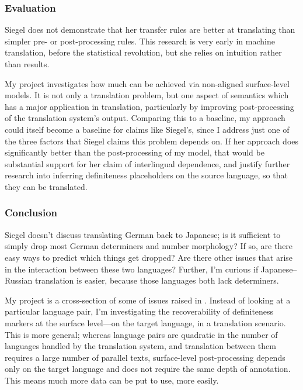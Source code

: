 \documentclass[11pt]{article}
\begin{document}
\subsubsection*{Evaluation}

Siegel does not demonstrate that her transfer rules are better at translating than simpler pre- or post-processing rules. This research is very early in machine translation, before the statistical revolution, but she relies on intuition rather than results.

My project investigates how much can be achieved via non-aligned surface-level models. It is not only a translation problem, but one aspect of semantics which has a major application in translation, particularly by improving post-processing of the translation system's output. Comparing this to a baseline, my approach could itself become a baseline for claims like Siegel's, since I address just one of the three factors that Siegel claims this problem depends on. If her approach does significantly better than the post-processing of my model, that would be substantial support for her claim of interlingual dependence, and justify further research into inferring definiteness placeholders on the source language, so that they can be translated.


\subsubsection*{Conclusion}

Siegel doesn't discuss translating German back to Japanese; is it sufficient to simply drop most German determiners and number morphology? If so, are there easy ways to predict which things get dropped? Are there other issues that arise in the interaction between these two languages? Further, I'm curious if Japanese--Russian translation is easier, because those languages both lack determiners.

My project is a cross-section of some of issues raised in \citet{siegel:1996}. Instead of looking at a particular language pair, I'm investigating the recoverability of definiteness markers at the surface level---on the target language, in a translation scenario. This is more general; whereas language pairs are quadratic in the number of languages handled by the translation system, and translation between them requires a large number of parallel texts, surface-level post-processing depends only on the target language and does not require the same depth of annotation. This means much more data can be put to use, more easily.
\end{document}
